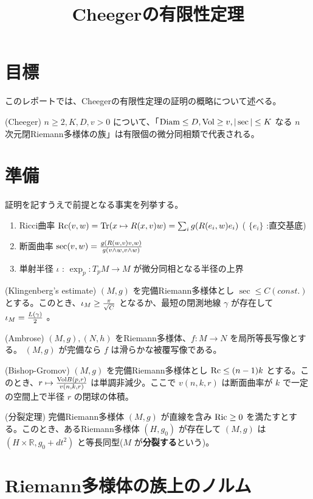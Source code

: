 \documentclass[dvipdfmx,a4paper]{jsarticle}
\theoremstyle{definition}
\newcommand{\Vol}{{\rm Vol}}
\newcommand{\Ric}{{\rm Ric}}
\newcommand{\Rc}{{\rm Rc}}
\newcommand{\R}{\mathbb{R}}
\begin{document}
\title{Cheegerの有限性定理}
\date{}

\maketitle

\section{目標}
このレポートでは、Cheegerの有限性定理の証明の概略について述べる。

\thm (Cheeger) $n \geq 2,K,D,v>0$ について、「$\mbox{Diam} \leq D,\Vol \geq v,|\sec| \leq K$ なる $n$ 次元閉Riemann多様体の族」は有限個の微分同相類で代表される。

\section{準備}
証明を記すうえで前提となる事実を列挙する。
\begin{enumerate}
    \item Ricci曲率 $\Rc(v,w)=\Tr(x \mapsto R(x,v)w)=\sum_i g(R(e_i,w)e_i)$ ( $\{e_i\}$ :直交基底)
    \item 断面曲率 $\sec(v,w)={g(R(w,v)v,w) \over g(v \wedge w,v \wedge w)}$
    \item 単射半径 $\iota$ : $\exp_p:T_pM \to M$ が微分同相となる半径の上界
\end{enumerate}

\thm (Klingenberg's estimate) $(M,g)$ を完備Riemann多様体とし $\sec \leq C (const.)$ とする。このとき、$\iota_M \geq {\pi \over \sqrt{C}}$ となるか、最短の閉測地線 $\gamma$ が存在して $\iota_M={L(\gamma) \over 2}$ 。

\thm (Ambrose) $(M,g),(N,h)$ をRiemann多様体、$f:M \to N$ を局所等長写像とする。 $(M,g)$ が完備なら $f$ は滑らかな被覆写像である。

\thm (Bishop-Gromov) $(M,g)$ を完備Riemann多様体とし $\Rc \leq (n-1)k$ とする。このとき、$r \mapsto {\Vol B(p,r) \over v(n,k,r)}$ は単調非減少。ここで $v(n,k,r)$ は断面曲率が $k$ で一定の空間上で半径 $r$ の閉球の体積。

\thm\label{thmsplit} (分裂定理) 完備Riemann多様体 $(M,g)$ が直線を含み $\Ric \geq 0$ を満たすとする。このとき、あるRiemann多様体 $(H,g_0)$ が存在して $(M,g)$ は $(H \times \R,g_0+dt^2)$ と等長同型($M$ が\textbf{分裂する}という)。

\section{Riemann多様体の族上のノルム}
\end{document}
